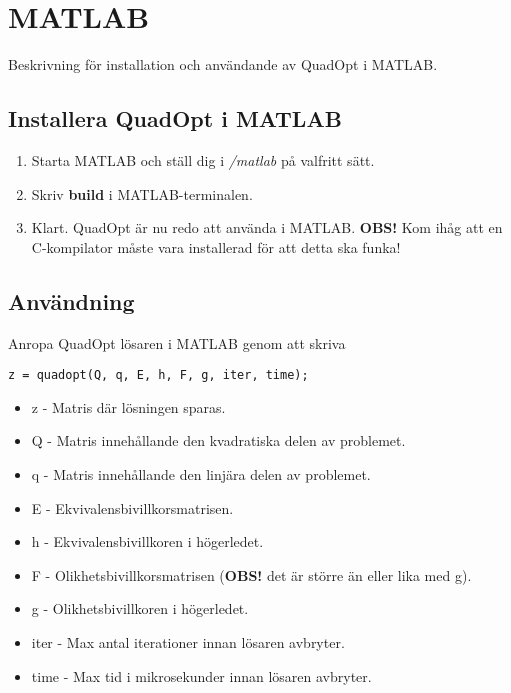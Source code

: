 \section{MATLAB}
Beskrivning för installation och användande av QuadOpt i MATLAB.

\subsection{Installera QuadOpt i MATLAB}
\begin{enumerate}
	\item Starta MATLAB och ställ dig i \emph{/matlab} på valfritt sätt. 
	\item Skriv \textbf{build} i MATLAB-terminalen.
	\item Klart. QuadOpt är nu redo att använda i MATLAB.
	\newline
	\newline
	\textbf{OBS!} Kom ihåg att en C-kompilator måste vara installerad för att detta ska funka!
\end{enumerate}

\subsection{Användning}
Anropa QuadOpt lösaren i MATLAB genom att skriva

\begin{lstlisting}
z = quadopt(Q, q, E, h, F, g, iter, time);
\end{lstlisting}

\begin{itemize}
	\item z - Matris där lösningen sparas.
	\item Q - Matris innehållande den kvadratiska delen av problemet.
	\item q - Matris innehållande den linjära delen av problemet.
	\item E - Ekvivalensbivillkorsmatrisen.
	\item h - Ekvivalensbivillkoren i högerledet.
	\item F - Olikhetsbivillkorsmatrisen (\textbf{OBS!} det är större än eller lika med g).
	\item g - Olikhetsbivillkoren i högerledet.
	\item iter - Max antal iterationer innan lösaren avbryter.
	\item time - Max tid i mikrosekunder innan lösaren avbryter.
\end{itemize}
